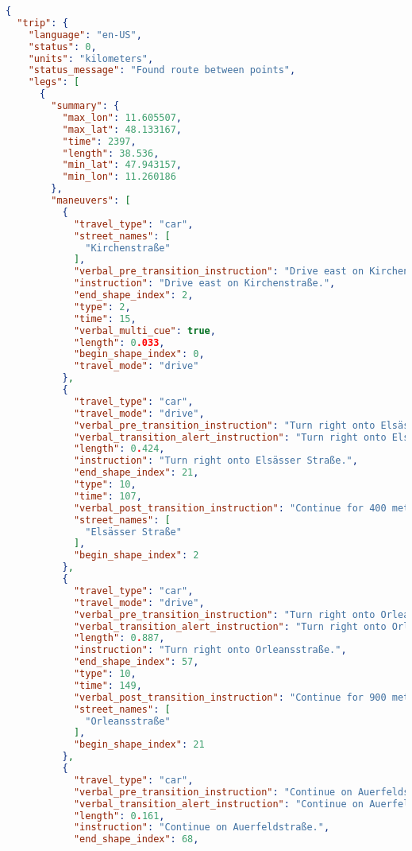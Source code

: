 ﻿\begin{lstlisting}[language=json,breaklines=true]
{
  "trip": {
    "language": "en-US",
    "status": 0,
    "units": "kilometers",
    "status_message": "Found route between points",
    "legs": [
      {
        "summary": {
          "max_lon": 11.605507,
          "max_lat": 48.133167,
          "time": 2397,
          "length": 38.536,
          "min_lat": 47.943157,
          "min_lon": 11.260186
        },
        "maneuvers": [
          {
            "travel_type": "car",
            "street_names": [
              "Kirchenstraße"
            ],
            "verbal_pre_transition_instruction": "Drive east on Kirchenstraße for 30 meters. Then Turn right onto Elsässer Straße.",
            "instruction": "Drive east on Kirchenstraße.",
            "end_shape_index": 2,
            "type": 2,
            "time": 15,
            "verbal_multi_cue": true,
            "length": 0.033,
            "begin_shape_index": 0,
            "travel_mode": "drive"
          },
          {
            "travel_type": "car",
            "travel_mode": "drive",
            "verbal_pre_transition_instruction": "Turn right onto Elsässer Straße.",
            "verbal_transition_alert_instruction": "Turn right onto Elsässer Straße.",
            "length": 0.424,
            "instruction": "Turn right onto Elsässer Straße.",
            "end_shape_index": 21,
            "type": 10,
            "time": 107,
            "verbal_post_transition_instruction": "Continue for 400 meters.",
            "street_names": [
              "Elsässer Straße"
            ],
            "begin_shape_index": 2
          },
          {
            "travel_type": "car",
            "travel_mode": "drive",
            "verbal_pre_transition_instruction": "Turn right onto Orleansstraße.",
            "verbal_transition_alert_instruction": "Turn right onto Orleansstraße.",
            "length": 0.887,
            "instruction": "Turn right onto Orleansstraße.",
            "end_shape_index": 57,
            "type": 10,
            "time": 149,
            "verbal_post_transition_instruction": "Continue for 900 meters.",
            "street_names": [
              "Orleansstraße"
            ],
            "begin_shape_index": 21
          },
          {
            "travel_type": "car",
            "verbal_pre_transition_instruction": "Continue on Auerfeldstraße for 200 meters.",
            "verbal_transition_alert_instruction": "Continue on Auerfeldstraße.",
            "length": 0.161,
            "instruction": "Continue on Auerfeldstraße.",
            "end_shape_index": 68,

\end{lstlisting}
